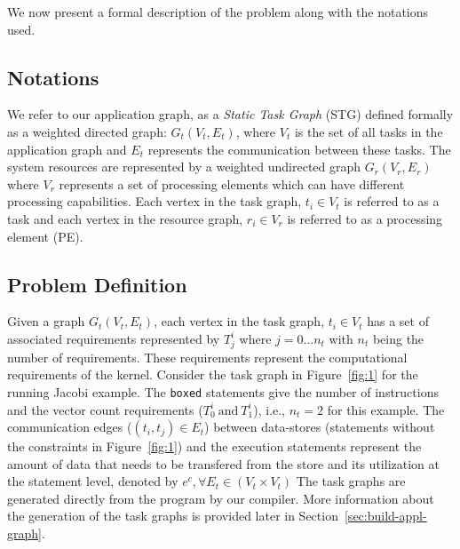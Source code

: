 \documentclass[10pt, conference, compsocconf]{IEEEtran}
\begin{document}
We now present a formal description of the problem along with the
notations used.

\subsection{Notations}

We refer to our application graph, as a \textit{Static Task Graph} (STG)
defined formally as a weighted directed graph: $G_t(V_t, E_t)$, where
$V_t$ is the set of all tasks in the application graph and $E_t$
represents the communication between these tasks. The system resources
are represented by a weighted undirected graph $G_r(V_r, E_r)$ where
$V_r$ represents a set of processing elements which can have different
processing capabilities. Each vertex in the task graph, $t_i \in V_t$ is
referred to as a task and each vertex in the resource graph, $r_i \in
V_r$ is referred to as a processing element
(PE). %

\subsection{Problem Definition}

Given a graph $G_t(V_t, E_t)$, each vertex in the task graph, $t_i \in
V_t$ has a set of associated requirements represented by $T^{i}_{j}$
where $j=0...n_t$ with $n_t$ being the number of requirements. These
requirements represent the computational requirements of the
kernel. Consider the task graph in Figure~\ref{fig:1} for the running
Jacobi example. The \texttt{boxed} statements give the number of
instructions and the vector count requirements ($T^i_0\ \mathrm{and}\
T^i_1$), i.e., $n_t=2$ for this example. The communication edges ($(t_i,
t_j) \in E_t$) between data-stores (statements without the constraints
in Figure~\ref{fig:1}) and the execution statements represent the amount
of data that needs to be transfered from the store and its utilization
at the statement level, denoted by $e^c, \forall E_t \in (V_t \times
V_t)$ The task graphs are generated directly from the program by our
compiler. More information about the generation of the task graphs is
provided later in Section~\ref{sec:build-appl-graph}.

\end{document}
